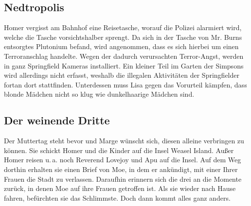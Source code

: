 
\subsection{Nedtropolis}
Homer vergisst am Bahnhof eine Reisetasche, worauf die Polizei alarmiert wird, welche die Tasche vorsichtshalber sprengt. Da sich in der Tasche von Mr. Burns entsorgtes Plutonium befand, wird angenommen, dass es sich hierbei um einen Terroranschlag handelte. Wegen der dadurch verursachten Terror-Angst, werden in ganz Springfield Kameras installiert. Ein kleiner Teil im Garten der Simpsons wird allerdings nicht erfasst, weshalb die illegalen Aktivitäten der Springfielder fortan dort stattfinden. Unterdessen muss Lisa gegen das Vorurteil kämpfen, dass blonde Mädchen nicht so klug wie dunkelhaarige Mädchen sind.



\subsection{Der weinende Dritte}\label{MABF13}
Der Muttertag steht bevor und Marge wünscht sich, diesen alleine verbringen zu können. Sie schickt Homer und die Kinder auf die Insel \glqq Weasel Island\grqq . Außer Homer reisen u.\,a. noch Reverend Lovejoy und Apu auf die Insel.  Auf dem Weg dorthin erhalten sie einen Brief von Moe, in dem er ankündigt, mit einer Ihrer Frauen die Stadt zu verlassen. Daraufhin erinnern sich die drei an die Momente zurück, in denen Moe auf ihre Frauen getroffen ist. Als sie wieder nach Hause fahren, befürchten sie das Schlimmste. Doch dann kommt alles ganz anders. 

